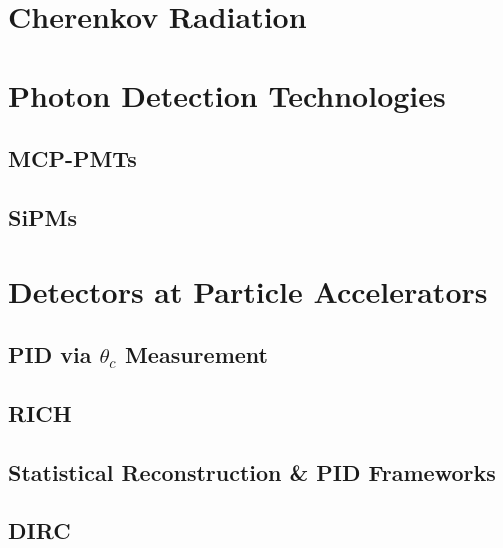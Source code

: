 \documentclass[%
 aapm,
 mph,%
 amsmath,amssymb,
 reprint,%
]{revtex4-2}
\begin{document}
\section{\label{sec:cherenkov-radiation}Cherenkov Radiation}



\section{\label{sec:photomultipliers}Photon Detection Technologies}



\subsection{\label{sec:mcp-pmts}MCP-PMTs}


\subsection{\label{sec:sipms}SiPMs}




\section{\label{sec:cherenkov-imaging-detectors}Detectors at Particle Accelerators}

\subsection{\label{sec:mass-spectrometry}PID via \(\theta_c\) Measurement}


\subsection{\label{sec:rich}RICH}


\subsection{\label{sec:statistical-event-reconstruction-methods}Statistical Reconstruction \& PID Frameworks}


\subsection{\label{sec:dirc}DIRC}
\vspace{1em}

\end{document}
